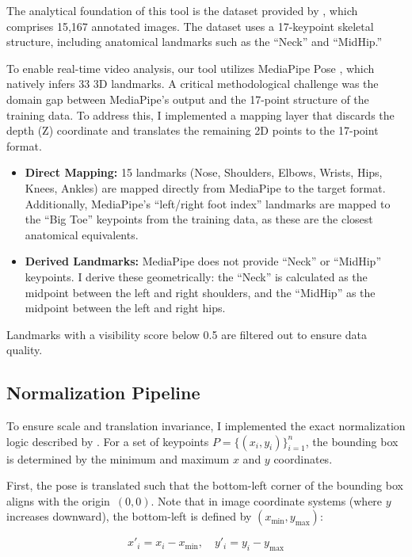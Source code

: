 \documentclass[12pt, a4paper]{article}
\begin{document}
The analytical foundation of this tool is the dataset provided by \citet{tsolak2025unveiling}, which comprises 15,167 annotated images. The dataset uses a 17-keypoint skeletal structure, including anatomical landmarks such as the ``Neck'' and ``MidHip.''

To enable real-time video analysis, our tool utilizes MediaPipe Pose \citep{mediapipe2019}, which natively infers 33 3D landmarks. A critical methodological challenge was the domain gap between MediaPipe's output and the 17-point structure of the training data. To address this, I implemented a mapping layer that discards the depth (Z) coordinate and translates the remaining 2D points to the 17-point format.

\begin{itemize}[nosep]
    \item \textbf{Direct Mapping:} 15 landmarks (Nose, Shoulders, Elbows, Wrists, Hips, Knees, Ankles) are mapped directly from MediaPipe to the target format. Additionally, MediaPipe's ``left/right foot index'' landmarks are mapped to the ``Big Toe'' keypoints from the training data, as these are the closest anatomical equivalents.
    \item \textbf{Derived Landmarks:} MediaPipe does not provide ``Neck'' or ``MidHip'' keypoints. I derive these geometrically: the ``Neck'' is calculated as the midpoint between the left and right shoulders, and the ``MidHip'' as the midpoint between the left and right hips.
\end{itemize}

\noindent Landmarks with a visibility score below 0.5 are filtered out to ensure data quality. 


\subsection{Normalization Pipeline}
\label{sec:normalization}

To ensure scale and translation invariance, I implemented the exact normalization logic described by \citet{tsolak2025unveiling}. For a set of keypoints $P = \{(x_i, y_i)\}_{i=1}^{n}$, the bounding box is determined by the minimum and maximum $x$ and $y$ coordinates.

First, the pose is translated such that the bottom-left corner of the bounding box aligns with the origin~$(0, 0)$. Note that in image coordinate systems (where $y$ increases downward), the bottom-left is defined by $(x_{\min}, y_{\max})$:

\begin{equation}
    x'_i = x_i - x_{\min}, \quad y'_i = y_i - y_{\max}
    \label{eq:translation}
\end{equation}
\end{document}
